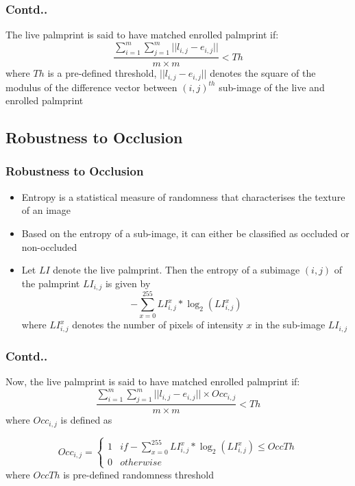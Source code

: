 \documentclass{beamer}
\begin{document}
\begin{frame}
\frametitle{Contd..}
The live palmprint is said to have matched enrolled palmprint if:
\begin{equation}
\label{matching}
\frac{\displaystyle\sum_{i=1}^{m} \sum_{j=1}^{m} ||l_{i,j} - e_{i,j}||}{m \times m} < Th
\end{equation}
where $Th$ is a pre-defined threshold, $||l_{i,j} - e_{i,j}||$ denotes the square of the modulus of the difference vector between $(i,j)^{th}$ sub-image of the live and enrolled palmprint
\end{frame}

\subsection{Robustness to Occlusion}
\begin{frame}
\frametitle{Robustness to Occlusion}
	\begin{itemize}
		\item Entropy is a statistical measure of randomness that characterises the texture of an image \cite{entropy_randomness}
		\item Based on the entropy of a sub-image, it can either be classified as occluded or non-occluded
		\item  Let $LI$ denote the live palmprint. Then the entropy of a 
subimage $(i,j)$  of the palmprint $LI_{i,j}$ is given by
\begin{equation}
  - \displaystyle\sum_{x=0}^{255} LI_{i,j}^{x} * \log_{2} (LI_{i,j}^{x})
\end{equation}
where $LI_{i,j}^{x}$ denotes the number of pixels of intensity $x$ in the sub-image $LI_{i,j}$
	\end{itemize}
\end{frame}

\begin{frame}
\frametitle{Contd..}
Now, the live palmprint is said to have matched enrolled palmprint if:
\begin{equation}
  \frac{\displaystyle\sum_{i=1}^{m} \sum_{j=1}^{m} ||l_{i,j} - e_{i,j}|| \times Occ_{i,j}}{m \times m} < Th
\end{equation}
where $Occ_{i,j}$ is defined as

\begin{equation}
Occ_{i,j} =  
\begin{cases} 1 & if - \displaystyle\sum_{x=0}^{255} LI_{i,j}^{x} * \log_{2} (LI_{i,j}^{x}) \le OccTh  \\ 0 & otherwise \end{cases} 
\end{equation}
where $OccTh$ is pre-defined randomness threshold
\end{frame}
\end{document}

